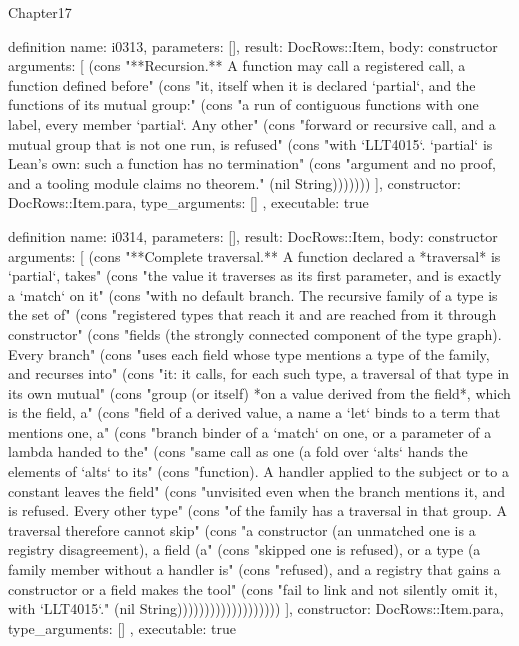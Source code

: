 \begin{lexlean}{Chapter17}
\begin{semanticmodule}
definition{
  name: i0313,
  parameters: [],
  result: DocRows::Item,
  body: constructor{
    arguments: [
      (cons "**Recursion.** A function may call a registered call, a function defined before" (cons "it, itself when it is declared `partial`, and the functions of its mutual group:" (cons "a run of contiguous functions with one label, every member `partial`. Any other" (cons "forward or recursive call, and a mutual group that is not one run, is refused" (cons "with `LLT4015`. `partial` is Lean's own: such a function has no termination" (cons "argument and no proof, and a tooling module claims no theorem." (nil String)))))))
    ],
    constructor: DocRows::Item.para,
    type_arguments: []
  },
  executable: true
}

definition{
  name: i0314,
  parameters: [],
  result: DocRows::Item,
  body: constructor{
    arguments: [
      (cons "**Complete traversal.** A function declared a *traversal* is `partial`, takes" (cons "the value it traverses as its first parameter, and is exactly a `match` on it" (cons "with no default branch. The recursive family of a type is the set of" (cons "registered types that reach it and are reached from it through constructor" (cons "fields (the strongly connected component of the type graph). Every branch" (cons "uses each field whose type mentions a type of the family, and recurses into" (cons "it: it calls, for each such type, a traversal of that type in its own mutual" (cons "group (or itself) *on a value derived from the field*, which is the field, a" (cons "field of a derived value, a name a `let` binds to a term that mentions one, a" (cons "branch binder of a `match` on one, or a parameter of a lambda handed to the" (cons "same call as one (a fold over `alts` hands the elements of `alts` to its" (cons "function). A handler applied to the subject or to a constant leaves the field" (cons "unvisited even when the branch mentions it, and is refused. Every other type" (cons "of the family has a traversal in that group. A traversal therefore cannot skip" (cons "a constructor (an unmatched one is a registry disagreement), a field (a" (cons "skipped one is refused), or a type (a family member without a handler is" (cons "refused), and a registry that gains a constructor or a field makes the tool" (cons "fail to link and not silently omit it, with `LLT4015`." (nil String)))))))))))))))))))
    ],
    constructor: DocRows::Item.para,
    type_arguments: []
  },
  executable: true
}


\end{semanticmodule}
\end{lexlean}
